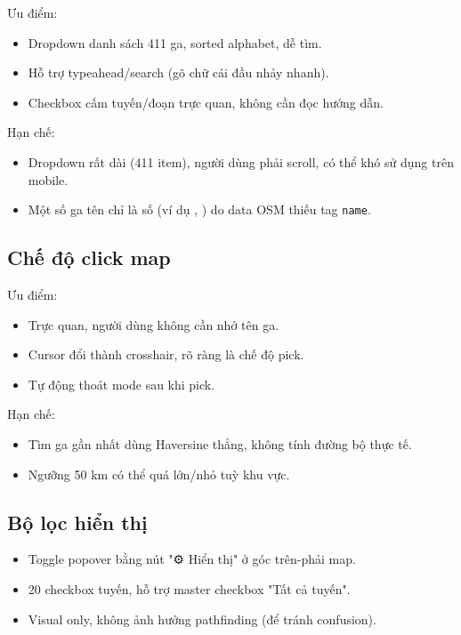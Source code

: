Ưu điểm:
\begin{itemize}
  \item Dropdown danh sách 411 ga, sorted alphabet, dễ tìm.
  \item Hỗ trợ typeahead/search (gõ chữ cái đầu nhảy nhanh).
  \item Checkbox cấm tuyến/đoạn trực quan, không cần đọc hướng dẫn.
\end{itemize}

Hạn chế:
\begin{itemize}
  \item Dropdown rất dài (411 item), người dùng phải scroll, có thể khó sử dụng trên mobile.
  \item Một số ga tên chỉ là số (ví dụ \textquotedbl, \textquotedbl) do data OSM thiếu tag \texttt{name}.
\end{itemize}

\subsection{Chế độ click map}

Ưu điểm:
\begin{itemize}
  \item Trực quan, người dùng không cần nhớ tên ga.
  \item Cursor đổi thành crosshair, rõ ràng là chế độ pick.
  \item Tự động thoát mode sau khi pick.
\end{itemize}

Hạn chế:
\begin{itemize}
  \item Tìm ga gần nhất dùng Haversine thẳng, không tính đường bộ thực tế.
  \item Ngưỡng 50 km có thể quá lớn/nhỏ tuỳ khu vực.
\end{itemize}

\subsection{Bộ lọc hiển thị}

\begin{itemize}
  \item Toggle popover bằng nút "⚙ Hiển thị" ở góc trên-phải map.
  \item 20 checkbox tuyến, hỗ trợ master checkbox "Tất cả tuyến".
  \item Visual only, không ảnh hưởng pathfinding (để tránh confusion).
\end{itemize}

